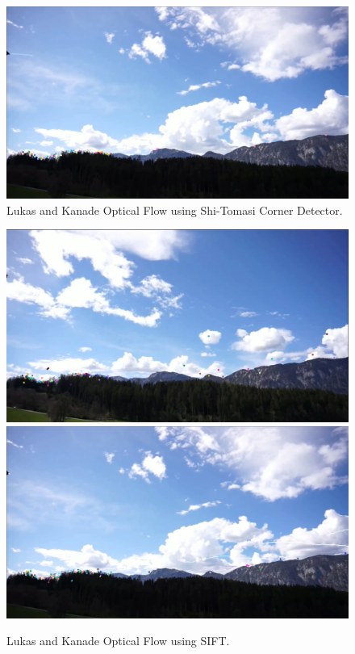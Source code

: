 \documentclass[UTF-8]{article}
\begin{document}
\begin{enumerate}[{Part} a.]
\begin{figure}[H]
	\includegraphics[width=0.9\linewidth]{_images/shi-tomasi_sky2}
	\caption{Lukas and Kanade Optical Flow using Shi-Tomasi Corner Detector. }
	\label{fig:shi-tomasisky}
\end{figure}
\begin{figure}[H]
	\centering
	\includegraphics[width=0.9\linewidth]{_images/sift_sky1}
	\includegraphics[width=0.9\linewidth]{_images/sift_sky2}
	\caption{Lukas and Kanade Optical Flow using SIFT.}
	\label{fig:siftsky}
\end{figure}



\end{enumerate}
\end{document}
